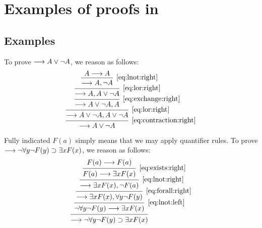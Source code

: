 \documentclass[11pt,a4paper]{article}
\begin{document}
\section{Examples of proofs in \LK}

\subsection{Examples}

\begin{example}
    To prove \(\longrightarrow A \lor\lnot A\), we reason as follows:
\begin{equation*}
    \begin{prooftree}
        \hypo{A\seq A}
        \infer1[\eqref{eq:lnot:right}]{\seq A, \lnot A}
        \infer1[\eqref{eq:lor:right}]{\seq A, A\lor\lnot A}
        \infer1[\eqref{eq:exchange:right}]{\seq A\lor\lnot A, A}
        \infer1[\eqref{eq:lor:right}]{\seq A\lor\lnot A, A\lor\lnot A}
        \infer1[\eqref{eq:contraction:right}]{\seq A \lor\lnot A}
    \end{prooftree}
\end{equation*}
\end{example}

\begin{example}\label{exa:fully indicated axiom}
    Fully indicated \(F(a)\) simply means that we may apply quantifier rules.
    To prove \(\longrightarrow\lnot\forall y\lnot F(y)\supset\exists x F(x)\),
    we reason as follows:
\begin{equation*}
    \begin{prooftree}
        \hypo{F(a)\seq F(a)}
        \infer1[\eqref{eq:exists:right}]{F(a)\seq\exists x F(x)}
        \infer1[\eqref{eq:lnot:right}]{\seq\exists x F(x), \lnot F(a)}
        \infer1[\eqref{eq:forall:right}]{\seq\exists x F(x), \forall y \lnot F(y)}
        \infer1[\eqref{eq:lnot:left}]{\lnot\forall y\lnot F(y)\seq\exists x F(x)}
        \infer1[]{\seq\lnot\forall y\lnot F(y)\limplies\exists x F(x)}
    \end{prooftree}
\end{equation*}
\end{example}
\end{document}
